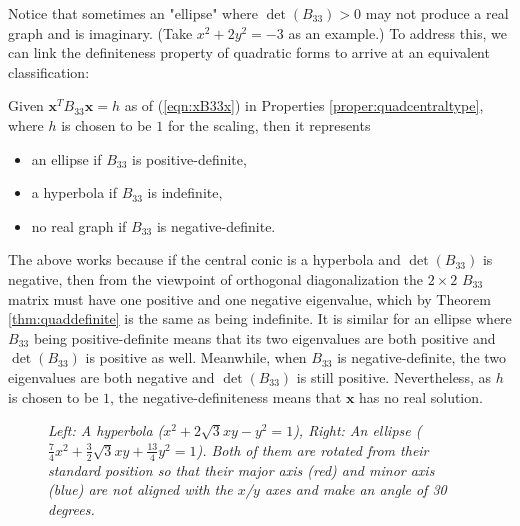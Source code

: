 Notice that sometimes an "ellipse" where $\det(B_{33}) > 0$ may not produce a real graph and is imaginary. (Take $x^2 + 2y^2 = -3$ as an example.) To address this, we can link the definiteness property of quadratic forms to arrive at an equivalent classification:
\begin{thm}
\label{thm:quadcentraltypealt}
Given $\textbf{x}^TB_{33}\textbf{x} = h$ as of (\ref{eqn:xB33x}) in Properties \ref{proper:quadcentraltype}, where $h$ is chosen to be $1$ for the scaling, then it represents
\begin{itemize}
\item an ellipse if $B_{33}$ is positive-definite,
\item a hyperbola if $B_{33}$ is indefinite,
\item no real graph if $B_{33}$ is negative-definite.
\end{itemize}
\end{thm}
The above works because if the central conic is a hyperbola and $\det(B_{33})$ is negative, then from the viewpoint of orthogonal diagonalization the $2 \times 2$ $B_{33}$ matrix must have one positive and one negative eigenvalue, which by Theorem \ref{thm:quaddefinite} is the same as being indefinite. It is similar for an ellipse where $B_{33}$ being positive-definite means that its two eigenvalues are both positive and $\det(B_{33})$ is positive as well. Meanwhile, when $B_{33}$ is negative-definite, the two eigenvalues are both negative and $\det(B_{33})$ is still positive. Nevertheless, as $h$ is chosen to be $1$, the negative-definiteness means that $\textbf{x}$ has no real solution.
\begin{figure}[h!]
\centering
{}
\caption{\textit{Left: A hyperbola ($x^2 + 2\sqrt{3}xy - y^2 = 1$), Right: An ellipse ($\frac{7}{4}x^2 + \frac{3}{2}\sqrt{3}xy + \frac{13}{4}y^2 = 1$). Both of them are rotated from their standard position so that their major axis (red) and minor axis (blue) are not aligned with the $x$/$y$ axes and make an angle of 30 degrees.}}
\label{fig:hyperellip}
\end{figure}

